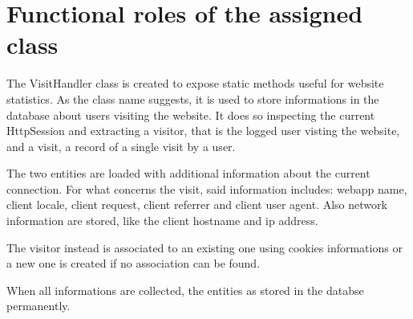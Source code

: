 \section{Functional roles of the assigned class}

The VisitHandler class is created to expose static methods useful for website statistics.
As the class name suggests, it is used to store informations in the database about
users visiting the website.
It does so inspecting the current HttpSession and extracting a visitor, that is the logged
user visting the website, and a visit, a record of a single visit by a user.

The two entities are loaded with additional information about the current connection.
For what concerns the visit, said information includes: webapp name, client locale,
client request, client referrer and client user agent. Also network information are
stored, like the client hostname and ip address.

The visitor instead is associated to an existing one using cookies informations or
a new one is created if no association can be found.

When all informations are collected, the entities as stored in the databse permanently.
